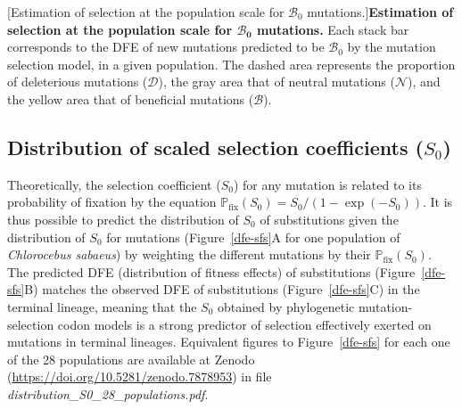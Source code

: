 \documentclass{article}
\newcommand{\proba}{\mathbb{P}}
\newcommand{\Sphy}{S_{0}}
\newcommand{\SphyBen}{\mathcal{B}_0}
\newcommand{\SpopDel}{\mathcal{D}}
\newcommand{\SpopNeu}{\mathcal{N}}
\newcommand{\SpopBen}{\mathcal{B}}
\begin{document}
\begin{center}
\begin{minipage}{0.75\linewidth}
\begin{minipage}{0.09\linewidth}
            \end{minipage}
        \end{minipage}
    [Estimation of selection at the population scale for $\SphyBen$ mutations.]{\textbf{Estimation of selection at the population scale for $\bm{\SphyBen}$ mutations.} Each stack bar corresponds to the DFE of new mutations predicted to be $\SphyBen$ by the mutation selection model, in a given population. The dashed area represents the proportion of deleterious mutations ($\SpopDel$), the gray area that of neutral mutations ($\SpopNeu$), and the yellow area that of beneficial mutations ($\SpopBen$).\label{fig:pop-pos}}
    \end{center}

    \newpage
    \subsection{Distribution of scaled selection coefficients (\texorpdfstring{$\Sphy$}{S₀})}\label{subsec:expectedDFE}

    Theoretically, the selection coefficient ($\Sphy$) for any mutation is related to its probability of fixation by the equation $\proba_{\text{fix}} (\Sphy) = \Sphy/(1-\exp(-\Sphy)) $.
    It is thus possible to predict the distribution of $\Sphy$ of substitutions given the distribution of $\Sphy$ for mutations (Figure~\ref{dfe-sfs}A for one population of \textit{Chlorocebus sabaeus}) by weighting the different mutations by their $\proba_{\text{fix}} (\Sphy)$.
    The predicted DFE (distribution of fitness effects) of substitutions (Figure~\ref{dfe-sfs}B) matches the observed DFE of substitutions (Figure~\ref{dfe-sfs}C) in the terminal lineage, meaning that the $\Sphy$ obtained by phylogenetic mutation-selection codon models is a strong predictor of selection effectively exerted on mutations in terminal lineages.
    Equivalent figures to Figure~\ref{dfe-sfs} for each one of the 28 populations are available at Zenodo (\url{https://doi.org/10.5281/zenodo.7878953}) in file \textit{distribution\_S0\_28\_populations.pdf}.\\
\end{document}
